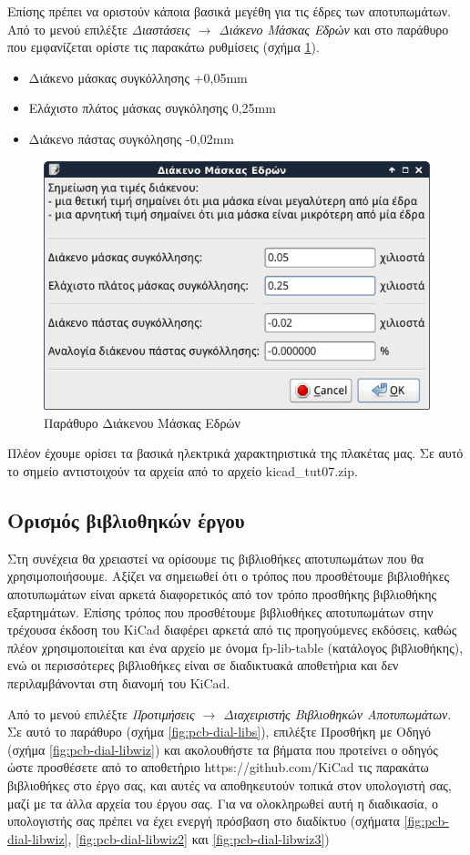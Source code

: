 \documentclass[a4paper]{article}
\begin{document}
Επίσης πρέπει να οριστούν κάποια βασικά μεγέθη για τις έδρες των αποτυπωμάτων. Από το μενού επιλέξτε \textit{Διαστάσεις $\rightarrow$ Διάκενο Μάσκας Εδρών} και στο παράθυρο που εμφανίζεται ορίστε τις παρακάτω ρυθμίσεις (σχήμα \ref{fig:pcb-dial-padclear}).

\begin{itemize}
    \item Διάκενο μάσκας συγκόλλησης +0,05mm
    \item Ελάχιστο πλάτος μάσκας συγκόλησης 0,25mm
    \item Διάκενο πάστας συγκόλησης -0,02mm
\end{itemize}

\begin{figure}
  \begin{center}
    \includegraphics[width=.5\textwidth]{img/pcb-dial-padclear.png}
    \caption{Παράθυρο Διάκενου Μάσκας Εδρών}
    \label{fig:pcb-dial-padclear}
  \end{center}
\end{figure}

Πλέον έχουμε ορίσει τα βασικά ηλεκτρικά χαρακτηριστικά της πλακέτας μας.
Σε αυτό το σημείο αντιστοιχούν τα αρχεία από το αρχείο kicad\_tut07.zip.

\subsection{Ορισμός βιβλιοθηκών έργου}
Στη συνέχεια θα χρειαστεί να ορίσουμε τις βιβλιοθήκες αποτυπωμάτων που θα χρησιμοποιήσουμε. Αξίζει να σημειωθεί ότι ο τρόπος που προσθέτουμε βιβλιοθήκες αποτυπωμάτων είναι αρκετά διαφορετικός από τον τρόπο προσθήκης βιβλιοθήκης εξαρτημάτων. Επίσης τρόπος που προσθέτουμε βιβλιοθήκες αποτυπωμάτων στην τρέχουσα έκδοση του KiCad διαφέρει αρκετά από τις προηγούμενες εκδόσεις, καθώς πλέον χρησιμοποιείται και ένα αρχείο με όνομα fp-lib-table (κατάλογος βιβλιοθήκης), ενώ οι περισσότερες βιβλιοθήκες είναι σε διαδικτυακά αποθετήρια και δεν περιλαμβάνονται στη διανομή του KiCad.

Από το μενού επιλέξτε \textit{Προτιμήσεις $\rightarrow$ Διαχειριστής Βιβλιοθηκών Αποτυπωμάτων}. Σε αυτό το παράθυρο (σχήμα \ref{fig:pcb-dial-libs}), επιλέξτε Προσθήκη με Οδηγό (σχήμα \ref{fig:pcb-dial-libwiz}) και ακολουθήστε τα βήματα που προτείνει ο οδηγός ώστε προσθέσετε από το αποθετήριο https://github.com/KiCad τις παρακάτω βιβλιοθήκες στο έργο σας, και αυτές να αποθηκευτούν τοπικά στον υπολογιστή σας, μαζί με τα άλλα αρχεία του έργου σας. Για να ολοκληρωθεί αυτή η διαδικασία, ο υπολογιστής σας πρέπει να έχει ενεργή πρόσβαση στο διαδίκτυο (σχήματα \ref{fig:pcb-dial-libwiz}, \ref{fig:pcb-dial-libwiz2} και \ref{fig:pcb-dial-libwiz3})
\end{document}

